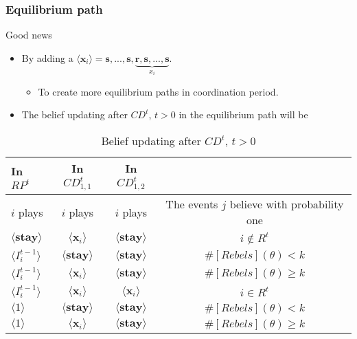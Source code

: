 \documentclass[10pt]{beamer}
\begin{document}
\begin{frame}
\frametitle{Equilibrium path}

Good news
\begin{itemize}
\item By adding a $\langle \mathbf{x}_i \rangle=\textbf{s},...,\textbf{s},\underbrace{\textbf{r},\textbf{s},...,\textbf{s}}_{x_i}$.
\begin{itemize}
\item To create more equilibrium paths in coordination period.
\end{itemize}
\item The belief updating after $CD^t$, $t>0$ in the equilibrium path will be

\end{itemize}


\begin{table}[ht]
\caption{Belief updating after $CD^t$, $t>0$}
\label{Table_blf_up_cdt12}
\begin{center}
\begin{tabular}{l c c c}
In $RP^t$ 	 	&  	In $CD^t_{1,1}$		&  In $CD^t_{1,2}$	  &\\
\hline
\hline
$i$ plays 		                             &  	$i$ plays		&				$i$ plays			& The events $j$ believe with probability one  \\
\hline
$\langle  \textbf{stay} \rangle$ 	& 	$\langle \mathbf{x}_i \rangle$	&  $\langle \textbf{stay} \rangle$ &  $i\notin R^t$ \\
$\langle  {I^{t-1}_i} \rangle$ 		&  $\langle \textbf{stay} \rangle$	&	$\langle \textbf{stay} \rangle$ &  $\#[Rebels](\theta)< k$   \\
$\langle  {I^{t-1}_i} \rangle$ 		&  $\langle \mathbf{x}_i \rangle$	&	$\langle \textbf{stay} \rangle$ &  $\#[Rebels](\theta)\geq k$    \\
$\langle  {I^{t-1}_i} \rangle$ 		&  $\langle \mathbf{x}_i \rangle$	&	$\langle \mathbf{x}_i \rangle$ &  $i\in R^t$  \\
$\langle 1 \rangle$ 		             &  $\langle \textbf{stay} \rangle$	&	$\langle \textbf{stay} \rangle$ &  $\#[Rebels](\theta)< k$\\
$\langle 1 \rangle$ 		             &  $\langle \mathbf{x}_i \rangle$	&	$\langle \textbf{stay} \rangle$ & $\#[Rebels](\theta)\geq k$
\end{tabular}
\end{center}
\end{table}

\end{frame}
\end{document}
